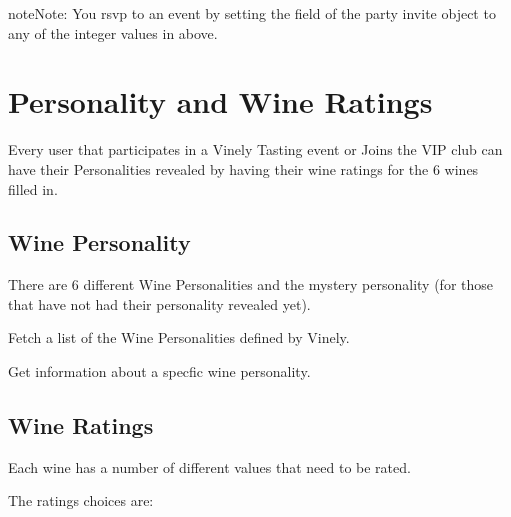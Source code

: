 \documentclass[letterpaper,10pt,english]{sphinxmanual}
\begin{document}
\begin{notice}{note}{Note:}
You rsvp to an event by setting the  field of the party invite object to any of the integer values in  above.
\end{notice}


\chapter{Personality and Wine Ratings}
\label{personality:ref-personality}\label{personality::doc}\label{personality:personality-and-wine-ratings}
Every user that participates in a Vinely Tasting event or Joins the VIP club
can have their Personalities revealed by having their wine ratings for the 6 wines filled in.


\section{Wine Personality}
\label{personality:wine-personality}
There are 6 different Wine Personalities and the mystery personality
(for those that have not had their personality revealed yet).

Fetch a list of the Wine Personalities defined by Vinely.


\begin{fulllineitems}
\label{personality:get--api-v1-personality-}
\end{fulllineitems}


Get information about a specfic wine personality.


\begin{fulllineitems}
\label{personality:get--api-v1-personality-_id_-}
\end{fulllineitems}



\section{Wine Ratings}
\label{personality:wine-ratings}
Each wine has a number of different values that need to be rated.

The ratings choices are:
\end{document}
